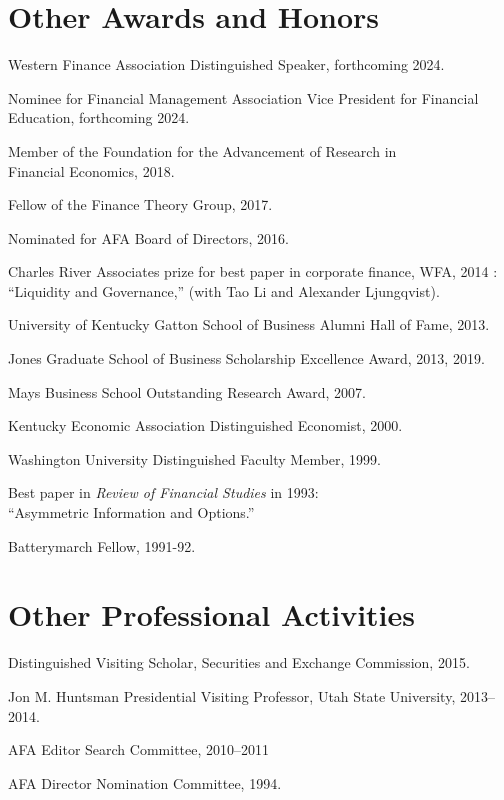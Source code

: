\documentclass[margin, 11pt]{res}
\newenvironment{list1}{
  \begin{list}{}{%
            \setlength{\itemsep}{0in}
      \setlength{\parsep}{0in} \setlength{\parskip}{0in}
      \setlength{\topsep}{0in} \setlength{\partopsep}{0in}
      \setlength{\leftmargin}{0.2in}}}{\end{list}}
\begin{document}
\begin{resume}
\section{\sc Other Awards and Honors}
\begin{list1}
  \item Western Finance Association Distinguished Speaker, forthcoming 2024.
  \item Nominee for Financial Management Association Vice President for Financial Education, forthcoming 2024.
  \item Member of the Foundation for the Advancement of Research in \\ \hspace*{0.5cm} Financial Economics, 2018.
\item Fellow of the Finance Theory Group, 2017.
\item Nominated for AFA Board of Directors, 2016.
\item Charles River Associates prize for best paper in corporate finance, WFA, 2014 :\\
\hspace*{0.5cm}``Liquidity and Governance,'' (with Tao Li and Alexander Ljungqvist).
\item University of Kentucky Gatton School of Business Alumni Hall of Fame, 2013.
\item Jones Graduate School of Business Scholarship Excellence Award, 2013, 2019.
\item Mays Business School Outstanding Research Award, 2007.
\item Kentucky Economic Association Distinguished Economist, 2000.
\item Washington University Distinguished Faculty Member, 1999.
\item Best paper in \textit{Review of Financial Studies} in 1993:\\
\hspace*{0.5cm} ``Asymmetric Information and Options.''
\item Batterymarch Fellow, 1991-92.
\end{list1}

\section{\sc Other Professional Activities}
\begin{list1}
\item Distinguished Visiting Scholar, Securities and Exchange Commission, 2015.
\item Jon M. Huntsman Presidential Visiting Professor, Utah State University, 2013--2014.
\item AFA Editor Search Committee, 2010--2011
\item AFA Director Nomination Committee, 1994.


\end{list1}



\end{resume}
\end{document}
